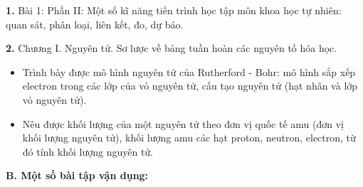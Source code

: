\documentclass[13pt,a4paper]{article}
\begin{document}
\textbf{1.} Bài 1: Phần II: Một số kĩ năng tiến trình học tập môn khoa học tự nhiên: quan sát, phân loại, liên kết, đo, dự báo.
\par\vspace{1pt}\noindent\dotfill\par\vspace{4pt}\noindent\dotfill\par\vspace{4pt}\noindent\dotfill\par\vspace{4pt}\noindent\dotfill\par\vspace{4pt}\noindent\dotfill\par\vspace{4pt}\noindent\dotfill\par\vspace{4pt}\noindent\dotfill\par\vspace{4pt}\noindent
\textbf{2.} Chương I. Nguyên tử. Sơ lược về bảng tuần hoàn các nguyên tố hóa học.
\begin{itemize}[leftmargin=*,itemsep=1pt]
  \item Trình bày được mô hình nguyên tử của Rutherford - Bohr: mô hình sắp xếp electron trong các lớp của vỏ nguyên tử, cấu tạo nguyên tử (hạt nhân và lớp vỏ nguyên tử).
  \item Nêu được khối lượng của một nguyên tử theo đơn vị quốc tế amu (đơn vị khối lượng nguyên tử), khối lượng amu các hạt proton, neutron, electron, từ đó tính khối lượng nguyên tử.
\end{itemize}
\par\vspace{1pt}\noindent\dotfill\par\vspace{4pt}\noindent\dotfill\par\vspace{4pt}\noindent\dotfill\par\vspace{4pt}\noindent\dotfill\par\vspace{4pt}\noindent\dotfill\par\vspace{4pt}\noindent\dotfill\par\vspace{4pt}\noindent\dotfill\par\vspace{4pt}\noindent\dotfill\par\vspace{4pt}\noindent
\vspace{4pt}
{\color{mySub}\textbf{B. Một số bài tập vận dụng:}}
\end{document}
